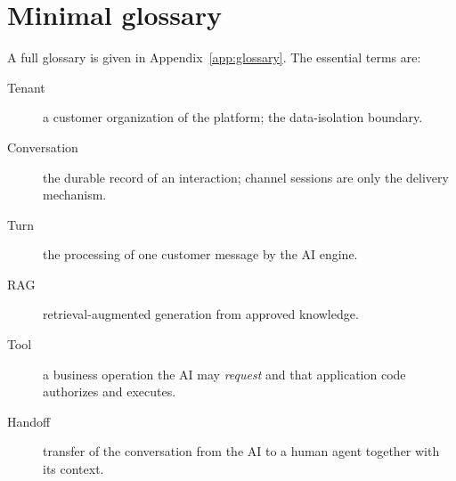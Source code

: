 \section{Minimal glossary}
A full glossary is given in Appendix~\ref{app:glossary}. The essential terms are:
\begin{description}
  \item[Tenant] a customer organization of the platform; the data-isolation boundary.
  \item[Conversation] the durable record of an interaction; channel sessions are only the delivery mechanism.
  \item[Turn] the processing of one customer message by the AI engine.
  \item[RAG] retrieval-augmented generation from approved knowledge.
  \item[Tool] a business operation the AI may \emph{request} and that application code authorizes and executes.
  \item[Handoff] transfer of the conversation from the AI to a human agent together with its context.
\end{description}
